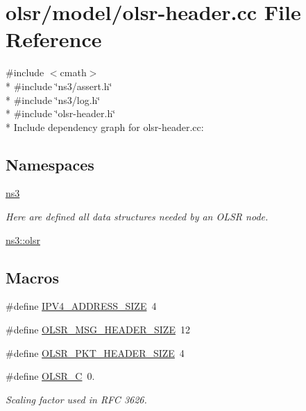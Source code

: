 \hypertarget{olsr-header_8cc}{}\section{olsr/model/olsr-\/header.cc File Reference}
\label{olsr-header_8cc}
{\ttfamily \#include $<$cmath$>$}\\*
{\ttfamily \#include \char`\"{}ns3/assert.\+h\char`\"{}}\\*
{\ttfamily \#include \char`\"{}ns3/log.\+h\char`\"{}}\\*
{\ttfamily \#include \char`\"{}olsr-\/header.\+h\char`\"{}}\\*
Include dependency graph for olsr-\/header.cc\+:
\subsection*{Namespaces}
\begin{DoxyCompactItemize}
\item 
 \hyperlink{namespacens3}{ns3}
\begin{DoxyCompactList}\small\item\em Here are defined all data structures needed by an O\+L\+SR node. \end{DoxyCompactList}\item 
 \hyperlink{namespacens3_1_1olsr}{ns3\+::olsr}
\end{DoxyCompactItemize}
\subsection*{Macros}
\begin{DoxyCompactItemize}
\item 
\#define \hyperlink{olsr-header_8cc_a78eabd4fb6c036f7de9b598066b3c39e}{I\+P\+V4\+\_\+\+A\+D\+D\+R\+E\+S\+S\+\_\+\+S\+I\+ZE}~4
\item 
\#define \hyperlink{olsr-header_8cc_a2ff8346b0475d5de88abb97751916cb1}{O\+L\+S\+R\+\_\+\+M\+S\+G\+\_\+\+H\+E\+A\+D\+E\+R\+\_\+\+S\+I\+ZE}~12
\item 
\#define \hyperlink{olsr-header_8cc_ac56fd329d499666d9b89f5adbe1b414b}{O\+L\+S\+R\+\_\+\+P\+K\+T\+\_\+\+H\+E\+A\+D\+E\+R\+\_\+\+S\+I\+ZE}~4
\item 
\#define \hyperlink{olsr-header_8cc_ad48dcbe9cd12eb486c7ab184cd901662}{O\+L\+S\+R\+\_\+C}~0.
\begin{DoxyCompactList}\small\item\em Scaling factor used in R\+FC 3626. \end{DoxyCompactList}\end{DoxyCompactItemize}
